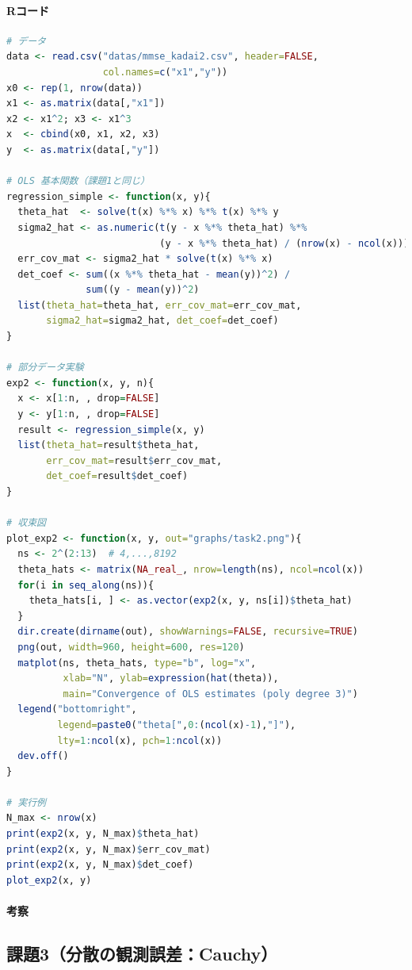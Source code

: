 \paragraph{Rコード}
\begin{lstlisting}[language=R]
# データ
data <- read.csv("datas/mmse_kadai2.csv", header=FALSE,
                 col.names=c("x1","y"))
x0 <- rep(1, nrow(data))
x1 <- as.matrix(data[,"x1"])
x2 <- x1^2; x3 <- x1^3
x  <- cbind(x0, x1, x2, x3)
y  <- as.matrix(data[,"y"])

# OLS 基本関数（課題1と同じ）
regression_simple <- function(x, y){
  theta_hat  <- solve(t(x) %*% x) %*% t(x) %*% y
  sigma2_hat <- as.numeric(t(y - x %*% theta_hat) %*%
                           (y - x %*% theta_hat) / (nrow(x) - ncol(x)))
  err_cov_mat <- sigma2_hat * solve(t(x) %*% x)
  det_coef <- sum((x %*% theta_hat - mean(y))^2) /
              sum((y - mean(y))^2)
  list(theta_hat=theta_hat, err_cov_mat=err_cov_mat,
       sigma2_hat=sigma2_hat, det_coef=det_coef)
}

# 部分データ実験
exp2 <- function(x, y, n){
  x <- x[1:n, , drop=FALSE]
  y <- y[1:n, , drop=FALSE]
  result <- regression_simple(x, y)
  list(theta_hat=result$theta_hat,
       err_cov_mat=result$err_cov_mat,
       det_coef=result$det_coef)
}

# 収束図
plot_exp2 <- function(x, y, out="graphs/task2.png"){
  ns <- 2^(2:13)  # 4,...,8192
  theta_hats <- matrix(NA_real_, nrow=length(ns), ncol=ncol(x))
  for(i in seq_along(ns)){
    theta_hats[i, ] <- as.vector(exp2(x, y, ns[i])$theta_hat)
  }
  dir.create(dirname(out), showWarnings=FALSE, recursive=TRUE)
  png(out, width=960, height=600, res=120)
  matplot(ns, theta_hats, type="b", log="x",
          xlab="N", ylab=expression(hat(theta)),
          main="Convergence of OLS estimates (poly degree 3)")
  legend("bottomright",
         legend=paste0("theta[",0:(ncol(x)-1),"]"),
         lty=1:ncol(x), pch=1:ncol(x))
  dev.off()
}

# 実行例
N_max <- nrow(x)
print(exp2(x, y, N_max)$theta_hat)
print(exp2(x, y, N_max)$err_cov_mat)
print(exp2(x, y, N_max)$det_coef)
plot_exp2(x, y)
\end{lstlisting}
\paragraph {考察}


\subsection{課題3（分散の観測誤差：Cauchy）}

